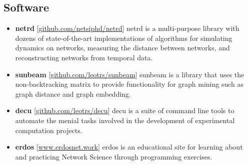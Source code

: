 \documentclass[12pt,]{scrartcl}
\begin{document}
\subsection{Software}\label{software}
\begin{itemize}
\leftskip-0.25in

\item \textbf{netrd} [\url{github.com/netsiphd/netrd}] netrd is a multi-purpose library with dozens of state-of-the-art implementations of algorithms for simulating dynamics on networks, measuring the distance between networks, and reconstructing networks from temporal data.

\item \textbf{sunbeam} [\url{github.com/leotrs/sunbeam}] sunbeam is a library that uses the non-backtracking matrix to provide functionality for graph mining such as graph distance and graph embedding.

\item \textbf{decu} [\url{github.com/leotrs/decu}] decu is a suite of command line tools to automate the menial tasks involved in the development of experimental computation projects.

\item \textbf{erdos} [\url{www.erdosnet.work}] erdos is an educational site for learning about and practicing Network Science through programming exercises.

\end{itemize}


\newpage
\end{document}
